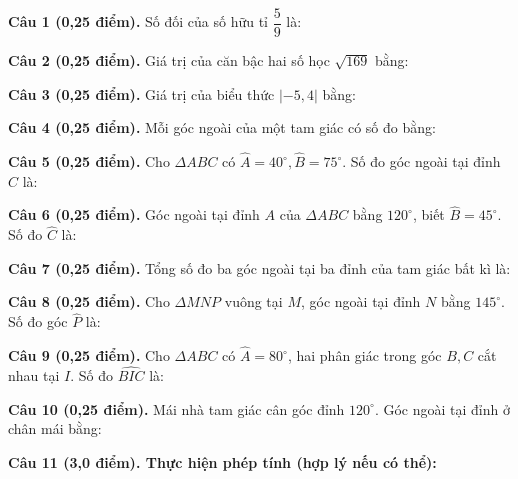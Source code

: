 \documentclass[12pt,a4paper]{article}
\begin{document}
\vspace{1.5mm}
\noindent\textbf{Câu 1 (0,25 điểm).} Số đối của số hữu tỉ $\dfrac{5}{9}$ là: \par\vspace{2.7mm}
\noindent\textbf{Câu 2 (0,25 điểm).} Giá trị của căn bậc hai số học $\sqrt{169}$ bằng: \par\vspace{2.7mm}
\noindent\textbf{Câu 3 (0,25 điểm).} Giá trị của biểu thức $|-5{,}4|$ bằng: \par\vspace{2.7mm}
\noindent\textbf{Câu 4 (0,25 điểm).} Mỗi góc ngoài của một tam giác có số đo bằng: \par\vspace{2.7mm}
\noindent\textbf{Câu 5 (0,25 điểm).} Cho $\Delta ABC$ có $\widehat{A} = 40^\circ, \widehat{B} = 75^\circ$. Số đo góc ngoài tại đỉnh $C$ là: \par\vspace{2.7mm}
\noindent\textbf{Câu 6 (0,25 điểm).} Góc ngoài tại đỉnh $A$ của $\Delta ABC$ bằng $120^\circ$, biết $\widehat{B} = 45^\circ$. Số đo $\widehat{C}$ là: \par\vspace{2.7mm}
\noindent\textbf{Câu 7 (0,25 điểm).} Tổng số đo ba góc ngoài tại ba đỉnh của tam giác bất kì là: \par\vspace{2.7mm}
\noindent\textbf{Câu 8 (0,25 điểm).} Cho $\Delta MNP$ vuông tại $M$, góc ngoài tại đỉnh $N$ bằng $145^\circ$. Số đo góc $\widehat{P}$ là: \par\vspace{2.7mm}
\noindent\textbf{Câu 9 (0,25 điểm).} Cho $\Delta ABC$ có $\widehat{A} = 80^\circ$, hai phân giác trong góc $B, C$ cắt nhau tại $I$. Số đo $\widehat{BIC}$ là: \par\vspace{2.7mm}
\noindent\textbf{Câu 10 (0,25 điểm).} Mái nhà tam giác cân góc đỉnh $120^\circ$. Góc ngoài tại đỉnh ở chân mái bằng: \par\vspace{2.7mm}
\vspace{0.2mm}
\noindent\textbf{Câu 11 (3,0 điểm). Thực hiện phép tính (hợp lý nếu có thể):}
\vspace{0.8mm}
\end{document}
